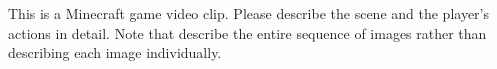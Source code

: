 This is a Minecraft game video clip. Please describe the scene and the player's actions in detail. Note that describe the entire sequence of images rather than describing each image individually.